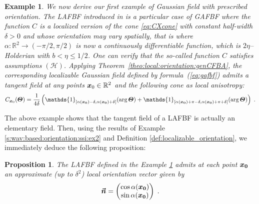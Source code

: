 \documentclass{elsarticle}
\newtheorem{proposition}{Proposition}
\newtheorem{example}{Example}
\def\R{\mbox{$\mathbb{R}$}}
\begin{document}
\begin{example} \label{ex:LAFBF}
We now derive our first example of Gaussian field with prescribed orientation. The LAFBF introduced in \cite{PCCP14,PCCP15}  is a particular case of GAFBF where the function $C$ is a localized version of the cone \eqref{eq:CXcone} with constant half-width $\delta>0$ and whose orientation may vary spatially, that is where $\alpha : \R^2 \to (-\pi/2,\pi/2)$ is now a continuously differentiable function, which is $2\eta$--Holderian with $b<\eta\leq 1/2$. One can verify that the so-called function $C$ satisfies assumptions $(\mathcal{H})$.  Applying Theorem~\ref{theo:local:orientation:genCFBA}, the corresponding localizable Gaussian field defined by formula~(\ref{eq:gafbf}) admits a tangent field at any points $\bm{x}_0\in \mathbb{R}^2$ and the following cone as local anisotropy:
\begin{equation}
\label{eq:C}
C_{\vect{x}_0}(\vect{\Theta})=\frac{1}{4\delta}\left(\mathds{1}_{[\alpha(\vect{x_0})-\delta,\alpha(\vect{x_0})+\delta]}(\arg \vect{\Theta})+\mathds{1}_{[\alpha(\vect{x_0})+\pi-\delta,\alpha(\vect{x_0})+\pi+\delta]}(\arg \vect{\Theta})\right)\;.
\end{equation}
\end{example}
The above example shows that the tangent field of a LAFBF is actually an elementary field. Then, using the results of Example \ref{s:wav:based:orientation:ssi:ex2} and Definition \ref{def:localizable_orientation}, we immediately deduce the following proposition:
\begin{proposition}\label{prop:lafbf_orientation}
The LAFBF defined in the Example \ref{ex:LAFBF}  admits at each point $\bm{x_0}$ an approximate (up to $\delta^2$) local orientation vector given by
\[
\bm{\vec n}=\begin{pmatrix}\cos \alpha(\bm{x_0})\\ \sin \alpha(\bm{x_0})\end{pmatrix}\;.
\]
\end{proposition} 
\end{document}
